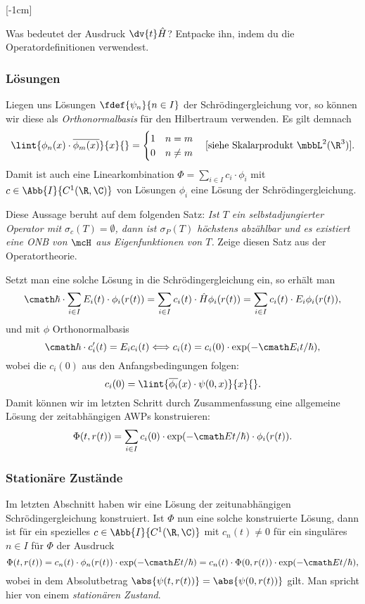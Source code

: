 \documentclass{subfiles}
\begin{document}
    [-1cm]
    \begin{Aufgabe}
        \nr{} Was bedeutet der Ausdruck $\dv{t}\hat H$? Entpacke ihn, indem du die Operatordefinitionen verwendest. 
    \end{Aufgabe}
    \subsubsection*{Lösungen}
        Liegen uns Lösungen $\fdef{\psi_n}{n\in I}$ der Schrödingergleichung vor, so können wir diese als \emph{Orthonormalbasis} für den Hilbertraum verwenden. Es gilt demnach
        \[\lint{\phi_n(x)\cdot\overline{\phi_m(x)}}{x}{} = \begin{cases}
            1 & n=m\\
            0 & n\neq m
        \end{cases}\quad [\text{siehe Skalarprodukt }\mbbL^2(\R^3)].\]
        Damit ist auch eine Linearkombination $\Phi = \sum_{i\in I}c_i\cdot\phi_i$ mit $c\in\Abb{I}{C^1(\R,\C)}$ von Lösungen $\phi_i$ eine Lösung der Schrödingergleichung. \\
        \begin{Aufgabe}
            \nr{} Diese Aussage beruht auf dem folgenden Satz: \textit{Ist $T$ ein selbstadjungierter Operator mit $\sigma_c(T)=\emptyset$, dann ist $\sigma_P(T)$ höchstens abzählbar und es existiert eine ONB von $\mcH$ aus Eigenfunktionen von $T$.} Zeige diesen Satz aus der Operatortheorie. 
        \end{Aufgabe}
        \noindent Setzt man eine solche Lösung in die Schrödingergleichung ein, so erhält man
        \[\cmath\hbar\cdot\sum_{i\in I}E_i(t)\cdot\phi_i(r(t)) = \sum_{i\in I}c_i(t)\cdot\hat H\phi_i(r(t)) = \sum_{i\in I}c_i(t)\cdot E_i\phi_i(r(t)),\]
        und mit $\phi$ Orthonormalbasis 
        \[\cmath\hbar\cdot c_i'(t) = E_i c_i(t) \Longleftrightarrow c_i(t) = c_i(0)\cdot\exp(-\cmath E_i t/\hbar),\]
        wobei die $c_i(0)$ aus den Anfangsbedingungen folgen:
        \[c_i(0) = \lint{\overline{\phi_i}(x)\cdot\psi(0,x)}{x}{}.\]
        Damit können wir im letzten Schritt durch Zusammenfassung eine allgemeine Lösung der zeitabhängigen AWPs konstruieren:
        \[\Phi(t,r(t)) = \sum_{i\in I}c_i(0)\cdot\exp(-\cmath E t/\hbar)\cdot\phi_i(r(t)).\]

    \subsubsection*{Stationäre Zustände}
        Im letzten Abschnitt haben wir eine Lösung der zeitunabhängigen Schrödingergleichung konstruiert. Ist $\Phi$ nun eine solche konstruierte Lösung, dann ist für ein spezielles $c\in\Abb{I}{C^1(\R,\C)}$ mit $c_n(t)\neq 0$ für ein singuläres $n\in I$ für $\Phi$ der Ausdruck
        \[\Phi(t,r(t)) = c_n(t)\cdot \phi_n(r(t))\cdot \exp(-\cmath Et/\hbar) = c_n(t)\cdot\Phi(0,r(t))\cdot\exp(-\cmath Et/\hbar),\]
        wobei in dem Absolutbetrag $\abs{\psi(t,r(t))} = \abs{\psi(0,r(t))}$ gilt. Man spricht hier von einem \emph{stationären Zustand}.
\end{document}
